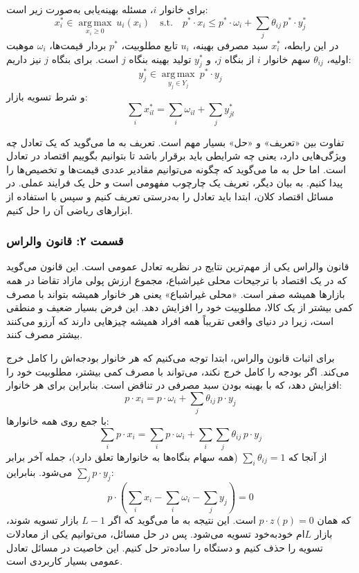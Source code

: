 \documentclass[12pt,a4paper]{article}
\newcommand{\argmax}{\operatorname*{arg\,max}}
\begin{document}
برای خانوار $i$، مسئله بهینه‌یابی به‌صورت زیر است:
\[
	x_i^* \in \argmax_{x_i \geq 0} \ u_i(x_i)
	\quad \text{s.t.} \quad
	p^* \cdot x_i \leq p^* \cdot \omega_i + \sum_{j} \theta_{ij} \, p^* \cdot y_j^*
\]
در این رابطه، $x_i^*$ سبد مصرفی بهینه، $u_i$ تابع مطلوبیت، $p^*$ بردار قیمت‌ها، $\omega_i$ موهبت اولیه، $\theta_{ij}$ سهم خانوار $i$ از بنگاه $j$، و $y_j^*$ تولید بهینه بنگاه $j$ است. برای بنگاه $j$ نیز داریم:
\[
	y_j^* \in \argmax_{y_j \in Y_j} \ p^* \cdot y_j
\]
و شرط تسویه بازار:
\[
	\sum_{i} x_{il}^* = \sum_{i} \omega_{il} + \sum_{j} y_{jl}^*
\]

تفاوت بین «تعریف» و «حل» بسیار مهم است. تعریف به ما می‌گوید که یک تعادل چه ویژگی‌هایی دارد، یعنی چه شرایطی باید برقرار باشد تا بتوانیم بگوییم اقتصاد در تعادل است. اما حل به ما می‌گوید که چگونه می‌توانیم مقادیر عددی قیمت‌ها و تخصیص‌ها را پیدا کنیم. به بیان دیگر، تعریف یک چارچوب مفهومی است و حل یک فرایند عملی. در مسائل اقتصاد کلان، ابتدا باید تعادل را به‌درستی تعریف کنیم و سپس با استفاده از ابزارهای ریاضی آن را حل کنیم.

\subsubsection*{قسمت ۲: قانون والراس}

قانون والراس یکی از مهم‌ترین نتایج در نظریه تعادل عمومی است. این قانون می‌گوید که در یک اقتصاد با ترجیحات محلی غیراشباع، مجموع ارزش پولی مازاد تقاضا در همه بازارها همیشه صفر است. «محلی غیراشباع» یعنی هر خانوار همیشه بتواند با مصرف کمی بیشتر از یک کالا، مطلوبیت خود را افزایش دهد. این فرض بسیار ضعیف و منطقی است، زیرا در دنیای واقعی تقریباً همه افراد همیشه چیزهایی دارند که آرزو می‌کنند بیشتر مصرف کنند.

برای اثبات قانون والراس، ابتدا توجه می‌کنیم که هر خانوار بودجه‌اش را کامل خرج می‌کند. اگر بودجه را کامل خرج نکند، می‌تواند با مصرف کمی بیشتر، مطلوبیت خود را افزایش دهد، که با بهینه بودن سبد مصرفی در تناقض است. بنابراین برای هر خانوار:
\[
	p \cdot x_i = p \cdot \omega_i + \sum_{j} \theta_{ij} \, p \cdot y_j
\]
با جمع روی همه خانوارها:
\[
	\sum_{i} p \cdot x_i = \sum_{i} p \cdot \omega_i + \sum_{i} \sum_{j} \theta_{ij} \, p \cdot y_j
\]
از آنجا که $\sum_{i} \theta_{ij} = 1$ (همه سهام بنگاه‌ها به خانوارها تعلق دارد)، جمله آخر برابر $\sum_j p \cdot y_j$ می‌شود. بنابراین:
\[
	p \cdot \left( \sum_{i} x_i - \sum_{i} \omega_i - \sum_{j} y_j \right) = 0
\]
که همان $p \cdot z(p) = 0$ است. این نتیجه به ما می‌گوید که اگر $L-1$ بازار تسویه شوند، بازار $L$ام خودبه‌خود تسویه می‌شود. پس در حل مسائل، می‌توانیم یکی از معادلات تسویه را حذف کنیم و دستگاه را ساده‌تر حل کنیم. این خاصیت در مسائل تعادل عمومی بسیار کاربردی است.
\end{document}
